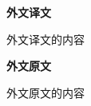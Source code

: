\documentclass{csustThesis}
\begin{document}
    \makeTranslationCover
    
    \pagestyle{empty}  %

    \begin{titlepage}
    \vspace*{\fill}

    \begin{center}
        \bfseries 外文译文
    \end{center}

    \vspace*{\fill}
    \end{titlepage}

外文译文的内容

    \begin{titlepage}
    \vspace*{\fill}

    \begin{center}
        \bfseries 外文原文
    \end{center}

    \vspace*{\fill}
    \end{titlepage}

外文原文的内容
% 
\end{document}
